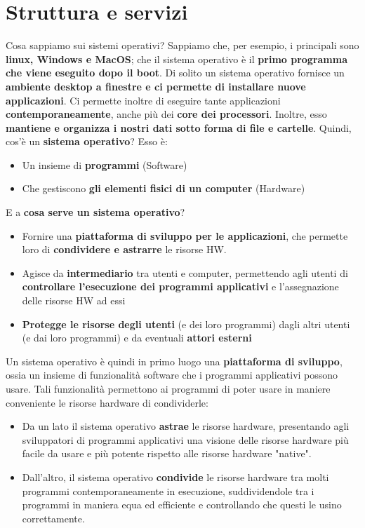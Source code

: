 \documentclass[12pt]{article}
\begin{document}
\section{Struttura e servizi}
Cosa sappiamo sui sistemi operativi? Sappiamo che, per esempio, i principali sono
\textbf{linux, Windows e MacOS}; che il sistema operativo è il 
\textbf{primo programma che viene eseguito dopo il boot}. Di solito un sistema operativo
fornisce un \textbf{ambiente desktop a finestre e ci permette di installare nuove applicazioni}.
Ci permette inoltre di eseguire tante applicazioni \textbf{contemporaneamente}, anche più dei \textbf{core dei processori}.
Inoltre, esso \textbf{mantiene e organizza i nostri dati sotto forma di file e cartelle}.
Quindi, cos'è un \textbf{sistema operativo}? Esso è:
\begin{itemize}
    \item Un insieme di \textbf{programmi} (Software)
    \item Che gestiscono \textbf{gli elementi fisici di un computer} (Hardware)
\end{itemize}
E a \textbf{cosa serve un sistema operativo}?
\begin{itemize}
    \item Fornire una \textbf{piattaforma di sviluppo per le applicazioni}, che permette loro di \textbf{condividere e astrarre} le risorse HW.
    \item Agisce da \textbf{intermediario} tra utenti e computer, permettendo agli utenti di \textbf{controllare l'esecuzione dei programmi applicativi} e l'assegnazione delle risorse HW ad essi
    \item \textbf{Protegge le risorse degli utenti} (e dei loro programmi) dagli altri utenti (e dai loro programmi) e da eventuali \textbf{attori esterni}
\end{itemize}
Un sistema operativo è quindi in primo luogo una \textbf{piattaforma di sviluppo}, ossia un insieme di funzionalità software che i programmi applicativi possono usare.
Tali funzionalità permettono ai programmi di poter usare in maniere conveniente le risorse hardware di condividerle:
\begin{itemize}
    \item Da un lato il sistema operativo \textbf{astrae} le risorse hardware, presentando agli sviluppatori di programmi applicativi una visione delle risorse hardware più facile da usare e più potente rispetto alle risorse hardware "native".
    \item Dall'altro, il sistema operativo \textbf{condivide} le risorse hardware tra molti programmi contemporaneamente in esecuzione, suddividendole tra i programmi in maniera equa ed efficiente e controllando che questi le usino correttamente.
\end{itemize}
\end{document}
